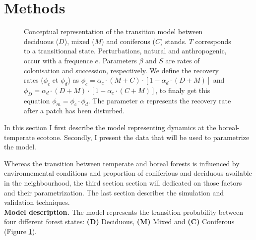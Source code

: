 \section{Methods}   

\begin{figure}
	
	\caption{Conceptual representation of the transition model between deciduous ($D$),
	mixed ($M$) and coniferous ($C$) stands. $T$ corresponds to a transitionnal state.
	Perturbations, natural and anthropogenic, occur with a frequence $e$. Parameters $\beta$
	and $S$ are rates of colonisation and succession,
	respectively. We define the recovery rates ($\phi_c$ et $\phi_d$) as $\phi_c
	= \alpha_c \cdot (M+C) \cdot [1- \alpha_d \cdot (D +M)]$ and $\phi_D =
	\alpha_d \cdot (D+M) \cdot [1- \alpha_c \cdot (C +M)]$, to finaly get this
	equation $\phi_m = \phi_c \cdot \phi_d$. The parameter $\alpha$ represents the
	recovery rate after a patch has been disturbed.}
	\label{Model}
\end{figure}

In this section I first describe the  model representing dynamics at the
boreal-temperate ecotone. Secondly, I present the  data that will be used to
parametrize the model.


Whereas the transition between temperate and boreal forests is influenced by
environnemental conditions and proportion of coniferious and deciduous
available in the neighbourhood, the third section section will dedicated on
those factors and their parametrization. The last section describes the
simulation and validation techniques.\\




\textbf{Model description.} The model represents the transition probability
between four different forest states: \textbf{(D)} Deciduous, \textbf{(M)}
Mixed and \textbf{(C)} Coniferous (Figure \ref{Model}).


